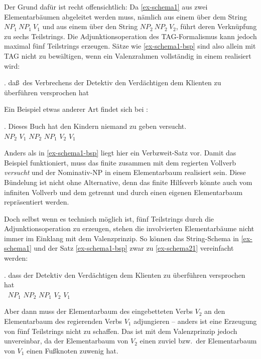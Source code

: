 Der Grund dafür ist recht offensichtlich: Da \ref{ex-schema1} aus zwei Elementarbäumen abgeleitet werden muss, nämlich aus einem über dem String $\mathit{NP}_1 ~ \mathit{NP}_1 ~ V_1$ und aus einem über den String $\mathit{NP}_2 ~ \mathit{NP}_2 ~ V_2$, führt deren Verknüpfung zu sechs Teilstrings. Die Adjunktionsoperation des TAG-Formalismus kann jedoch maximal fünf Teilstrings erzeugen. Sätze wie \ref{ex-schema1-bsp} sind also allein mit TAG nicht zu bewältigen, wenn ein Valenzrahmen vollständig in einem  realisiert wird:

\ex. da\ss \ des Verbrechens der Detektiv den Verdächtigen dem Klienten zu überführen versprochen hat \hfill\label{ex-schema1-bsp}\mbox{\citep[(2b)]{Becker:Joshi:Rambow:91}}

Ein Beispiel etwas anderer Art findet sich bei \cite{Rambow:94}:

\exg. {Dieses Buch} hat {den Kindern} niemand {zu geben} versucht.  \\
$\mathit{NP}_2$ $V_1$ $\mathit{NP}_2$ $\mathit{NP}_1$ $V_2$ $V_1$ \\
\citep[42]{Rambow:94} \label{ex-schema2}

Anders als in \ref{ex-schema1-bsp} liegt hier ein Verbzweit-Satz vor. Damit das Beispiel funktioniert, muss das finite  zusammen mit dem regierten Vollverb {\it versucht} und der Nominativ-NP in einem Elementarbaum realisiert sein. Diese Bündelung ist nicht ohne Alternative, denn das finite Hilfsverb könnte auch vom infiniten Vollverb und dem  getrennt und durch einen eigenen Elementarbaum repräsentiert werden. 

Doch selbst wenn es technisch möglich ist, fünf Teilstrings durch die Adjunktionsoperation zu erzeugen, stehen die involvierten Elementarbäume nicht immer im Einklang mit dem Valenzprinzip. So können das String-Schema in \ref{ex-schema1} und der Satz \ref{ex-schema1-bsp} zwar zu \ref{ex-schema21} vereinfacht werden: 

\exg. dass {der Detektiv} {den Verdächtigen} {dem Klienten} {zu überführen} {versprochen hat}  \\
$~$ $\mathit{NP}_1$ $\mathit{NP}_2$ $\mathit{NP}_1$ $V_2$ $V_1$ \\
\label{ex-schema21}

Aber dann muss der Elementarbaum des eingebetteten Verbs $V_2$ an den Elementarbaum des regierenden Verbs $V_1$ adjungieren -- anders ist eine Erzeugung von fünf Teilstrings nicht zu schaffen. Das ist mit dem Valenzprinzip jedoch unvereinbar, da der Elementarbaum von $V_2$ einen  zuviel bzw.\ der Elementarbaum von $V_1$ einen Fu\ss knoten zuwenig hat.  %

